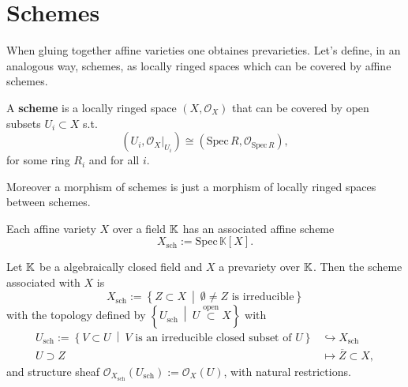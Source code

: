 \section{Schemes}
When gluing together affine varieties one obtaines prevarieties.
Let's define, in an analogous way, schemes, as locally ringed spaces which can be covered by
affine schemes.

\begin{defn}[Scheme]
	A \textbf{scheme} is a locally ringed space $\left( X, \mathcal{O}_{ X } \right)$
	that can be covered by open subsets $U_i \subset X$ s.t.
	\begin{equation}
	\left( U_i, \left.\mathcal{O}_X\right|_{U_i} \right) \cong
		\left( \mathrm{Spec}\, R, \mathcal{O}_{ \mathrm{Spec}\, R } \right)
	,\end{equation} 
	for some ring $R_i$ and for all $i$.

	Moreover a morphism of schemes is just a morphism of locally ringed
	spaces between schemes.
\end{defn}

\begin{rem}[]
	Each affine variety $X$ over a field $\mathbb{K}$ has an associated affine scheme
	\begin{equation}
	X_{\text{sch}} := \mathrm{Spec}\, \mathbb{K}[X]
	.\end{equation} 
\end{rem}

\begin{defn}
	Let $\mathbb{K}$ be a algebraically closed field and
	$X$ a prevariety over $\mathbb{K}$.
	Then the scheme associated with $X$ is
	\begin{equation}
	X_{\text{sch}} :=
	\left\{ Z \subset X \ \middle|\ \emptyset \neq Z \text{ is irreducible} \right\}
	\end{equation} 
	with the topology defined by $\left\{ U_{\text{sch}} \ \middle|\ U \stackrel{\text{open}}{\subset} X \right\}$
	with
	\begin{align}
	U_{\text{sch}} := \left\{ V \subset U \ \middle|\ V \text{ is an 
	irreducible closed subset of } U \right\} &\hookrightarrow X_{\text{sch}}\\
	U \supset Z &\mapsto \overline{Z} \subset X	
	,\end{align} 
	and structure sheaf $\mathcal{O}_{X_{\text{sch}}} \left( U_{\text{sch}} \right) := \mathcal{O}_{X} \left( U \right)$,
	with natural restrictions.
\end{defn}

